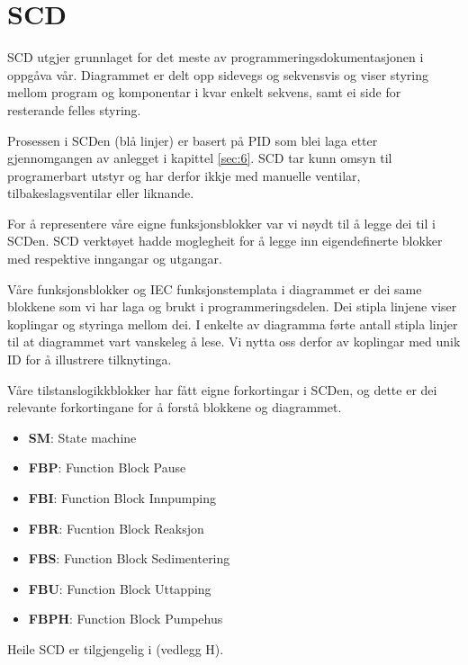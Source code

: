 \newpage
\section{SCD}
\thispagestyle{fancy}


\gls{SCD} utgjer grunnlaget for det meste av programmeringsdokumentasjonen i oppgåva vår.
Diagrammet er delt opp sidevegs og sekvensvis og viser styring mellom program og komponentar i kvar enkelt sekvens,
samt ei side for resterande felles styring.

Prosessen i \gls{SCD}en (blå linjer) er basert på \gls{PID} som blei laga etter gjennomgangen av anlegget i kapittel \ref{sec:6}.
\gls{SCD} tar kunn omsyn til programerbart utstyr og har derfor ikkje med manuelle ventilar, tilbakeslagsventilar eller liknande.

For å representere våre eigne funksjonsblokker var vi nøydt til å legge dei til i \gls{SCD}en.
\gls{SCD} verktøyet hadde moglegheit for å legge inn eigendefinerte blokker med respektive inngangar og utgangar.

Våre funksjonsblokker og \gls{IEC} funksjonstemplata i diagrammet er dei same blokkene som vi har laga og brukt i programmeringsdelen. 
Dei stipla linjene viser koplingar og styringa mellom dei. \newline
I enkelte av diagramma førte antall stipla linjer til at diagrammet vart vanskeleg å lese. Vi nytta oss derfor av koplingar med
unik ID for å illustrere tilknytinga.

Våre tilstanslogikkblokker har fått eigne forkortingar i \gls{SCD}en,  og dette er dei relevante forkortingane 
for å forstå blokkene og diagrammet.

\begin{itemize}
    \item \textbf{SM}:   State machine
    \item \textbf{FBP}:  Function Block Pause
    \item \textbf{FBI}:  Function Block Innpumping
    \item \textbf{FBR}:  Fucntion Block Reaksjon
    \item \textbf{FBS}:  Function Block Sedimentering
    \item \textbf{FBU}:  Function Block Uttapping
    \item \textbf{FBPH}: Function Block Pumpehus
\end{itemize}

Heile \gls{SCD} er tilgjengelig i (vedlegg H). \newline
\newpage

